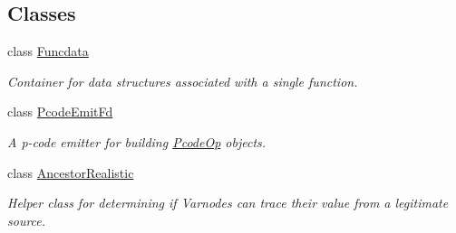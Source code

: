 \subsection*{Classes}
\begin{DoxyCompactItemize}
\item 
class \mbox{\hyperlink{class_funcdata}{Funcdata}}
\begin{DoxyCompactList}\small\item\em Container for data structures associated with a single function. \end{DoxyCompactList}\item 
class \mbox{\hyperlink{class_pcode_emit_fd}{Pcode\+Emit\+Fd}}
\begin{DoxyCompactList}\small\item\em A p-\/code emitter for building \mbox{\hyperlink{class_pcode_op}{Pcode\+Op}} objects. \end{DoxyCompactList}\item 
class \mbox{\hyperlink{class_ancestor_realistic}{Ancestor\+Realistic}}
\begin{DoxyCompactList}\small\item\em Helper class for determining if Varnodes can trace their value from a legitimate source. \end{DoxyCompactList}\end{DoxyCompactItemize}
